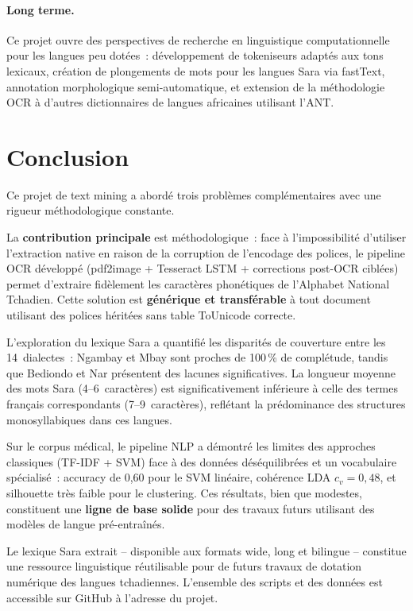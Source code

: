 \documentclass[11pt, a4paper, oneside]{article}
\begin{document}
\paragraph{Long terme.} Ce projet ouvre des perspectives de recherche en linguistique computationnelle pour les langues peu dotées~: développement de tokeniseurs adaptés aux tons lexicaux, création de plongements de mots pour les langues Sara via fastText, annotation morphologique semi-automatique, et extension de la méthodologie OCR à d'autres dictionnaires de langues africaines utilisant l'ANT.

\section{Conclusion}

Ce projet de text mining a abordé trois problèmes complémentaires avec une rigueur méthodologique constante.

La \textbf{contribution principale} est méthodologique~: face à l'impossibilité d'utiliser l'extraction native en raison de la corruption de l'encodage des polices, le pipeline OCR développé (pdf2image + Tesseract LSTM + corrections post-OCR ciblées) permet d'extraire fidèlement les caractères phonétiques de l'Alphabet National Tchadien. Cette solution est \textbf{générique et transférable} à tout document utilisant des polices héritées sans table ToUnicode correcte.

L'exploration du lexique Sara a quantifié les disparités de couverture entre les 14~dialectes~: Ngambay et Mbay sont proches de 100\,\% de complétude, tandis que Bediondo et Nar présentent des lacunes significatives. La longueur moyenne des mots Sara (4--6~caractères) est significativement inférieure à celle des termes français correspondants (7--9~caractères), reflétant la prédominance des structures monosyllabiques dans ces langues.

Sur le corpus médical, le pipeline NLP a démontré les limites des approches classiques (TF-IDF + SVM) face à des données déséquilibrées et un vocabulaire spécialisé~: accuracy de 0,60 pour le SVM linéaire, cohérence LDA $c_v = 0,48$, et silhouette très faible pour le clustering. Ces résultats, bien que modestes, constituent une \textbf{ligne de base solide} pour des travaux futurs utilisant des modèles de langue pré-entraînés.

Le lexique Sara extrait -- disponible aux formats wide, long et bilingue -- constitue une ressource linguistique réutilisable pour de futurs travaux de dotation numérique des langues tchadiennes. L'ensemble des scripts et des données est accessible sur GitHub à l'adresse du projet.

\newpage
\printbibliography[heading=bibintoc, title={Bibliographie}]
\end{document}
